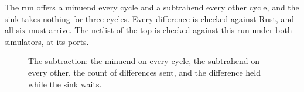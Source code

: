 The run offers a minuend every cycle and a subtrahend every other
cycle, and the sink takes nothing for three cycles. Every difference
is checked against Rust, and all six must arrive. The netlist of the
top is checked against this run under both simulators, at its ports.

\begin{figure}[htbp]
\centering

\caption{The subtraction: the minuend on every cycle, the subtrahend
on every other, the count of differences sent, and the difference
held while the sink waits.}
\label{fig:x-ports}
\end{figure}





